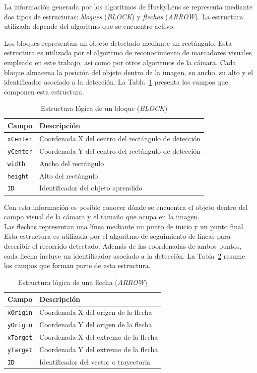 \documentclass{prgrado}
\begin{document}
La información generada por los algoritmos de HuskyLens se representa mediante dos tipos de estructuras: \textit{bloques} (\textit{BLOCK}) y \textit{flechas} (\textit{ARROW}). La estructura utilizada depende del algoritmo que se encuentre activo. 

Los bloques representan un objeto detectado mediante un rectángulo. Esta estructura es utilizada por el algoritmo de reconocimiento de marcadores visuales empleado en este trabajo, así como por otros algoritmos de la cámara. Cada bloque almacena la posición del objeto dentro de la imagen, su ancho, su alto y el identificador asociado a la detección. La Tabla~\ref{tab:block_campos} presenta los campos que componen esta estructura.

\begin{table}[htbp]
\centering
\caption{Estructura lógica de un bloque (\emph{BLOCK})}
\label{tab:block_campos}
\begin{tabular}{|l|l|}
\hline
\textbf{Campo} & \textbf{Descripción} \\ \hline
\texttt{xCenter} & Coordenada X del centro del rectángulo de detección \\ \hline
\texttt{yCenter} & Coordenada Y del centro del rectángulo de detección \\ \hline
\texttt{width}   & Ancho del rectángulo \\ \hline
\texttt{height}  & Alto del rectángulo \\ \hline
\texttt{ID}      & Identificador del objeto aprendido \\ \hline
\end{tabular}
\end{table}

Con esta información es posible conocer dónde se encuentra el objeto dentro del campo visual de la cámara y el tamaño que ocupa en la imagen. \\

Las flechas representan una línea mediante un punto de inicio y un punto final. Esta estructura es utilizada por el algoritmo de seguimiento de líneas para describir el recorrido detectado. Además de las coordenadas de ambos puntos, cada flecha incluye un identificador asociado a la detección. La Tabla~\ref{tab:arrow_campos} resume los campos que forman parte de esta estructura.

\begin{table}[H]
\centering
\caption{Estructura lógica de una flecha (\emph{ARROW})}
\label{tab:arrow_campos}
\begin{tabular}{|l|l|}
\hline
\textbf{Campo} & \textbf{Descripción} \\ \hline
\texttt{xOrigin} & Coordenada X del origen de la flecha \\ \hline
\texttt{yOrigin} & Coordenada Y del origen de la flecha \\ \hline
\texttt{xTarget} & Coordenada X del extremo de la flecha \\ \hline
\texttt{yTarget} & Coordenada Y del extremo de la flecha \\ \hline
\texttt{ID}      & Identificador del vector o trayectoria \\ \hline
\end{tabular}
\end{table}
\end{document}

